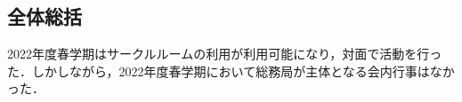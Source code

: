\subsection*{全体総括}


2022年度春学期はサークルルームの利用が利用可能になり，対面で活動を行った．しかしながら，2022年度春学期において総務局が主体となる会内行事はなかった．
